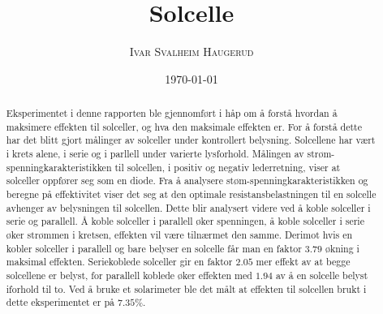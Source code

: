 \documentclass[%
 reprint,
 amsmath,amssymb,
 aps,
 norsk,
 booktabs
]{revtex4-1}
\begin{document}
\title{Solcelle}
\author{\textsc{Ivar Svalheim Haugerud}}
\date{\today}

\begin{abstract}
Eksperimentet i denne rapporten ble gjennomført i håp om å forstå hvordan å maksimere effekten til solceller, og hva den maksimale effekten er. For å forstå dette har det blitt gjort målinger av solceller under kontrollert belysning. Solcellene har vært i krets alene, i serie og i parllell under varierte lysforhold. Målingen av strøm-spenningkarakteristikken til solcellen, i positiv og negativ lederretning, viser at solceller oppfører seg som en diode. Fra å analysere støm-spenningkarakteristikken og beregne på effektivitet viser det seg at den optimale resistansbelastningen til en solcelle avhenger av belysningen til solcellen. Dette blir analysert videre ved å koble solceller i serie og parallell. Å koble solceller i parallell øker spenningen, å koble solceller i serie øker strømmen i kretsen, effekten vil være tilnærmet den samme. Derimot hvis en kobler solceller i parallell og bare belyser en solcelle får man en faktor $3.79$ økning i maksimal effekten. Seriekoblede solceller gir en faktor $2.05$ mer effekt av at begge solcellene er belyst, for parallell koblede øker effekten med $1.94$ av å en solcelle belyst iforhold til to. Ved å bruke et solarimeter ble det målt at effekten til solcellen brukt i dette eksperimentet er på $7.35\%$.
\end{abstract}

\maketitle

\end{document}
